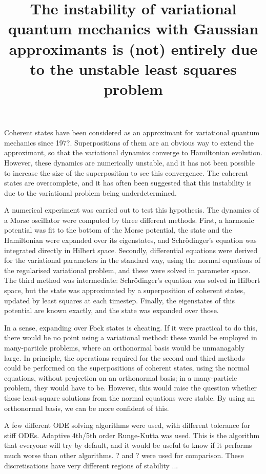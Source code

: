 



\title{The instability of variational quantum mechanics with Gaussian approximants is (not) entirely due to the unstable least squares problem}

Coherent states have been considered as an approximant for variational quantum mechanics since 197?.  Superpositions of them are an obvious way to extend the approximant, so that the variational dynamics converge to Hamiltonian evolution.  However, these dynamics are numerically unstable, and it has not been possible to increase the size of the superposition to see this convergence.  The coherent states are overcomplete, and it has often been suggested that this instability is due to the variational problem being underdetermined.

A numerical experiment was carried out to test this hypothesis.  The dynamics of a Morse oscillator were computed by three different methods.  First, a harmonic potential was fit to the bottom of the Morse potential, the state and the Hamiltonian were expanded over its eigenstates, and Schrödinger's equation was integrated directly in Hilbert space.  Secondly, differential equations were derived for the variational parameters in the standard way, using the normal equations of the regularised variational problem, and these were solved in parameter space.  The third method was intermediate: Schrödinger's equation was solved in Hilbert space, but the state was approximated by a superposition of coherent states, updated by least squares at each timestep.  Finally, the eigenstates of this potential are known exactly, and the state was expanded over those.

In a sense, expanding over Fock states is cheating.  If it were practical to do this, there would be no point using a variational method: these would be employed in many-particle problems, where an orthonormal basis would be unmanagably large.  In principle, the operations required for the second and third methods could be performed on the superpositions of coherent states, using the normal equations, without projection on an orthonormal basis; in a many-particle problem, they would have to be.  However, this would raise the question whether those least-square solutions from the normal equations were stable.  By using an orthonormal basis, we can be more confident of this.

A few different ODE solving algorithms were used, with different tolerance for stiff ODEs.  Adaptive 4th/5th order Runge-Kutta was used.  This is the algorithm that everyone will try by default, and it would be useful to know if it performs much worse than other algorithms.  ? and ? were used for comparison.  These discretisations have very different regions of stability ...

